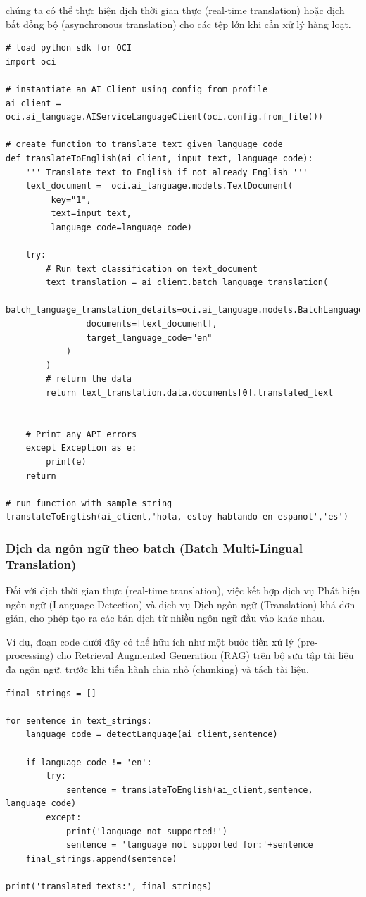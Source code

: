 chúng ta có thể thực hiện dịch thời gian thực (real-time translation) hoặc dịch bất đồng bộ (asynchronous translation) cho các tệp lớn khi cần xử lý hàng loạt.

\begin{lstlisting}
# load python sdk for OCI
import oci

# instantiate an AI Client using config from profile
ai_client = oci.ai_language.AIServiceLanguageClient(oci.config.from_file())

# create function to translate text given language code    
def translateToEnglish(ai_client, input_text, language_code):
    ''' Translate text to English if not already English '''
    text_document =  oci.ai_language.models.TextDocument(
         key="1",
         text=input_text,
         language_code=language_code)
    
    try:
        # Run text classification on text_document
        text_translation = ai_client.batch_language_translation(
            batch_language_translation_details=oci.ai_language.models.BatchLanguageTranslationDetails(
                documents=[text_document],
                target_language_code="en"
            )
        )
        # return the data
        return text_translation.data.documents[0].translated_text


    # Print any API errors
    except Exception as e:
        print(e)
    return

# run function with sample string
translateToEnglish(ai_client,'hola, estoy hablando en espanol','es')

\end{lstlisting}

\subsubsection{Dịch đa ngôn ngữ theo batch (Batch Multi-Lingual Translation)}
Đối với dịch thời gian thực (real-time translation), việc kết hợp dịch vụ Phát hiện ngôn ngữ (Language Detection) và dịch vụ Dịch ngôn ngữ (Translation) khá đơn giản, cho phép tạo ra các bản dịch từ nhiều ngôn ngữ đầu vào khác nhau.

Ví dụ, đoạn code dưới đây có thể hữu ích như một bước tiền xử lý (pre-processing) cho Retrieval Augmented Generation (RAG) trên bộ sưu tập tài liệu đa ngôn ngữ, trước khi tiến hành chia nhỏ (chunking) và tách tài liệu.

\begin{lstlisting}
final_strings = []

for sentence in text_strings:
    language_code = detectLanguage(ai_client,sentence)
    
    if language_code != 'en':
        try:
            sentence = translateToEnglish(ai_client,sentence, language_code)
        except:
            print('language not supported!')
            sentence = 'language not supported for:'+sentence
    final_strings.append(sentence)

print('translated texts:', final_strings)

\end{lstlisting}

